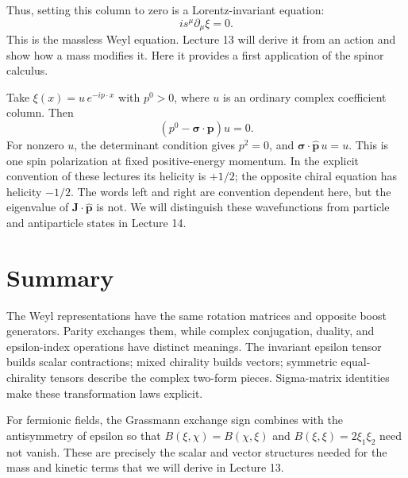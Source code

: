 \documentclass[11pt]{article}
\begin{document}
Thus, setting this column to zero is a
Lorentz-invariant equation:
\[
 i s^\mu\partial_\mu\xi=0.
\]
This is the massless Weyl equation. Lecture 13 will derive it from an
action and show how a mass modifies it. Here it provides a first
application of the spinor calculus.

Take \(\xi(x)=u\,e^{-ip\cdot x}\) with \(p^0>0\), where \(u\)
is an ordinary complex coefficient column. Then
\begin{equation}
 (p^0-\bm\sigma\cdot\bm p)u=0.
 \label{eq:masslessplane}
\end{equation}
For nonzero \(u\), the determinant condition gives \(p^2=0\), and
\(\bm\sigma\cdot\widehat{\bm p}\,u=u\). This is one spin
polarization at fixed positive-energy momentum. In the explicit
convention of these lectures its helicity is \(+1/2\); the opposite
chiral equation has helicity \(-1/2\). The words left and right are
convention dependent here, but the eigenvalue of
\(\bm J\cdot\widehat{\bm p}\) is not. We will distinguish these
wavefunctions from particle and antiparticle states in Lecture 14.


\section*{Summary}
The Weyl representations have the same rotation matrices and opposite
boost generators. Parity exchanges them, while complex conjugation,
duality, and epsilon-index operations have distinct meanings.
The invariant epsilon tensor builds scalar contractions; mixed
chirality builds vectors; symmetric equal-chirality tensors describe
the complex two-form pieces. Sigma-matrix identities make these
transformation laws explicit.

For fermionic fields, the Grassmann exchange sign combines with the
antisymmetry of epsilon so that \(B(\xi,\chi)=B(\chi,\xi)\) and
\(B(\xi,\xi)=2\xi_1\xi_2\) need not vanish. These are precisely the
scalar and vector structures needed for the mass and kinetic terms
that we will derive in Lecture 13.

\newpage
\end{document}

